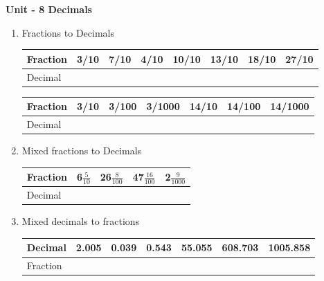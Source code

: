 \centerline{\textbf{ \LARGE  Unit - 8 \quad Decimals }}

\begin{enumerate}

    \item Fractions to Decimals

    \begin{myTableStyle} \begin{tabular}{ |m{2cm}|m{1cm}|m{1cm}|m{1cm}|m{1cm}|m{1cm}|m{1cm}|m{1cm}| } \hline
        Fraction & 3/10 & 7/10 & 4/10 & 10/10 & 13/10 & 18/10 & 27/10 \\ \hline
        Decimal &  &  & &  &  & &   \\ \hline
    \end{tabular} \end{myTableStyle} \vspace{0.08in}

    \begin{myTableStyle} \begin{tabular}{ |m{2cm}|m{1cm}|m{1cm}|m{1cm}|m{1cm}|m{1cm}|m{1.2cm}| } \hline
        Fraction & 3/10 & 3/100 & 3/1000 & 14/10 & 14/100 & 14/1000  \\ \hline
        Decimal &  &  & &  &  &   \\ \hline
    \end{tabular} \end{myTableStyle} \vspace{0.08in}

    \item Mixed fractions to Decimals

    \begin{myTableStyle} \begin{tabular}{ |m{2cm}|m{1cm}|m{1cm}|m{1cm}|m{1cm}| } \hline
        Fraction &  {\large 6$\frac{5}{10}$}  & {\large 26$\frac{8}{100}$}  & {\large 47$\frac{16}{100}$} & {\large 2$\frac{9}{1000}$} \\ \hline
        Decimal &  &  & &   \\ \hline
    \end{tabular} \end{myTableStyle} \vspace{0.08in}

    \item Mixed decimals to fractions

    \begin{myTableStyle} \begin{tabular}{ |m{2cm}|m{1cm}|m{1cm}|m{1cm}|m{1cm}|m{1.2cm}|m{1.3cm}| } \hline
        Decimal &  2.005  & 0.039  & 0.543 & 55.055 & 608.703 & 1005.858 \\ \hline
        Fraction&  &  &  &  & & \\ \hline
    \end{tabular} \end{myTableStyle} \vspace{0.08in}


\end{enumerate}

